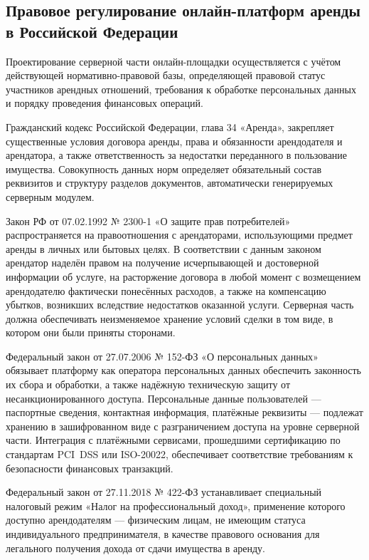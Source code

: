 \subsection{Правовое регулирование онлайн-платформ аренды в Российской Федерации}
 
Проектирование серверной части онлайн-площадки осуществляется с учётом действующей нормативно-правовой базы, определяющей правовой статус участников арендных отношений, требования к обработке персональных данных и порядку проведения финансовых операций.
 
Гражданский кодекс Российской Федерации, глава 34 «Аренда», закрепляет существенные условия договора аренды, права и обязанности арендодателя и арендатора, а также ответственность за недостатки переданного в пользование имущества\cite{zakon2}. Совокупность данных норм определяет обязательный состав реквизитов и структуру разделов документов, автоматически генерируемых серверным модулем.
 
Закон РФ от 07.02.1992 № 2300-1 «О защите прав потребителей» распространяется на правоотношения с арендаторами, использующими предмет аренды в личных или бытовых целях. В соответствии с данным законом арендатор наделён правом на получение исчерпывающей и достоверной информации об услуге, на расторжение договора в любой момент с возмещением арендодателю фактически понесённых расходов, а также на компенсацию убытков, возникших вследствие недостатков оказанной услуги. Серверная часть должна обеспечивать неизменяемое хранение условий сделки в том виде, в котором они были приняты сторонами\cite{zakon1}.
 
Федеральный закон от 27.07.2006 № 152-ФЗ «О персональных данных» обязывает платформу как оператора персональных данных обеспечить законность их сбора и обработки, а также надёжную техническую защиту от несанкционированного доступа. Персональные данные пользователей — паспортные сведения, контактная информация, платёжные реквизиты — подлежат хранению в зашифрованном виде с разграничением доступа на уровне серверной части\cite{zakon4}. Интеграция с платёжными сервисами, прошедшими сертификацию по стандартам PCI~DSS или ISO-20022, обеспечивает соответствие требованиям к безопасности финансовых транзакций.
 
Федеральный закон от 27.11.2018 № 422-ФЗ устанавливает специальный налоговый режим «Налог на профессиональный доход», применение которого доступно арендодателям --- физическим лицам, не имеющим статуса индивидуального предпринимателя, в качестве правового основания для легального получения дохода от сдачи имущества в аренду\cite{zakon3}.
 
